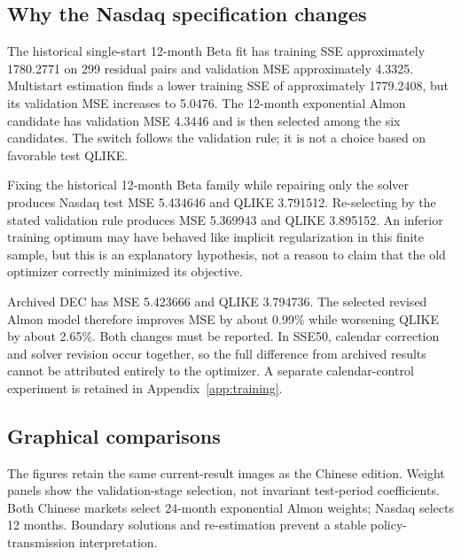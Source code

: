 \subsection{Why the Nasdaq specification changes}
The historical single-start 12-month Beta fit has training SSE approximately 1780.2771 on 299 residual pairs and validation MSE approximately 4.3325. Multistart estimation finds a lower training SSE of approximately 1779.2408, but its validation MSE increases to 5.0476. The 12-month exponential Almon candidate has validation MSE 4.3446 and is then selected among the six candidates. The switch follows the validation rule; it is not a choice based on favorable test QLIKE.

Fixing the historical 12-month Beta family while repairing only the solver produces Nasdaq test MSE 5.434646 and QLIKE 3.791512. Re-selecting by the stated validation rule produces MSE 5.369943 and QLIKE 3.895152. An inferior training optimum may have behaved like implicit regularization in this finite sample, but this is an explanatory hypothesis, not a reason to claim that the old optimizer correctly minimized its objective.

Archived DEC has MSE 5.423666 and QLIKE 3.794736. The selected revised Almon model therefore improves MSE by about 0.99\% while worsening QLIKE by about 2.65\%. Both changes must be reported. In SSE50, calendar correction and solver revision occur together, so the full difference from archived results cannot be attributed entirely to the optimizer. A separate calendar-control experiment is retained in Appendix~\ref{app:training}.

\subsection{Graphical comparisons}
The figures retain the same current-result images as the Chinese edition. Weight panels show the validation-stage selection, not invariant test-period coefficients. Both Chinese markets select 24-month exponential Almon weights; Nasdaq selects 12 months. Boundary solutions and re-estimation prevent a stable policy-transmission interpretation.

